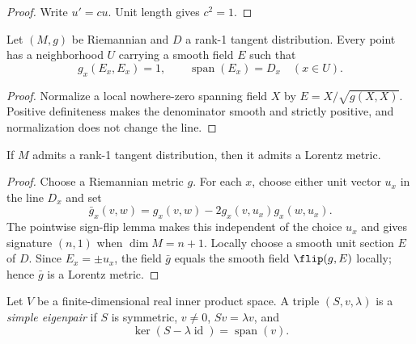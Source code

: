 \begin{proof}
\leanok
\sketch Write $u'=cu$. Unit length gives $c^2=1$.
\end{proof}

\begin{lemma}
\label{lem:local-unit-section}
\leanok
{}
Let $(M,g)$ be Riemannian and $D$ a rank-1 tangent distribution. Every point has
a neighborhood $U$ carrying a smooth field $E$ such that
\[
g_x(E_x,E_x)=1,
\qquad\operatorname{span}(E_x)=D_x
\quad(x\in U).
\]
\end{lemma}

\begin{proof}
\leanok
{}
\sketch Normalize a local nowhere-zero spanning field $X$ by
$E=X/\sqrt{g(X,X)}$. Positive definiteness makes the denominator smooth and
strictly positive, and normalization does not change the line.
\end{proof}

\begin{proposition}
\label{prop:lorentz-metric-of-rank-one-distribution}
\leanok
{}
If $M$ admits a rank-1 tangent distribution, then it admits a Lorentz metric.
\end{proposition}

\begin{proof}
\leanok
{}
\sketch Choose a Riemannian metric $g$. For each $x$, choose either unit vector
$u_x$ in the line $D_x$ and set
\[
\bar g_x(v,w)=g_x(v,w)-2g_x(v,u_x)g_x(w,u_x).
\]
The pointwise sign-flip lemma makes this independent of the choice $u_x$ and gives
signature $(n,1)$ when $\dim M=n+1$. Locally choose a smooth unit section $E$ of
$D$. Since $E_x=\pm u_x$, the field $\bar g$ equals the smooth field
$\flip(g,E)$ locally; hence $\bar g$ is a Lorentz metric.
\end{proof}

\begin{definition}
\label{def:simple-eigenpair}
\leanok
Let $V$ be a finite-dimensional real inner product space. A triple
$(S,v,\lambda)$ is a \emph{simple eigenpair} if $S$ is symmetric, $v\ne0$,
$Sv=\lambda v$, and
\[
\ker(S-\lambda\operatorname{id})=\operatorname{span}(v).
\]
\end{definition}


